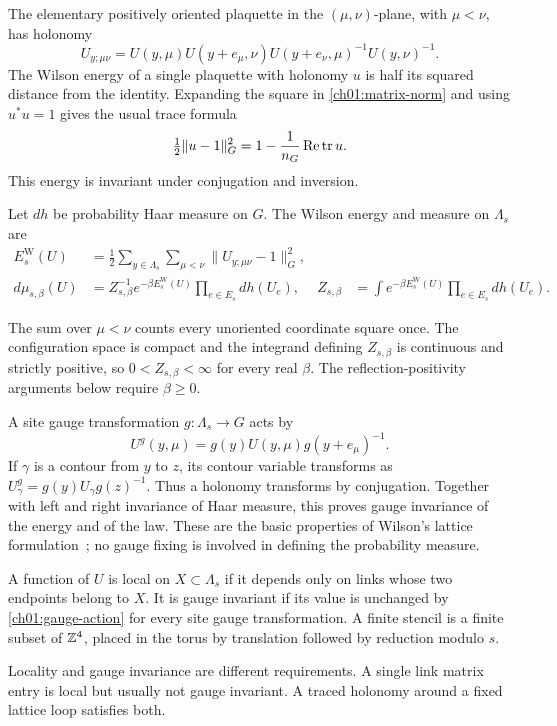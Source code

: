 The elementary positively oriented plaquette in the $(\mu,\nu)$-plane,
with $\mu<\nu$, has holonomy
\begin{equation}
 U_{y;\mu\nu}=U(y,\mu)U(y+e_\mu,\nu)
                 U(y+e_\nu,\mu)^{-1}U(y,\nu)^{-1}.
 \label{ch01:plaquette}
\end{equation}
The Wilson energy of a single plaquette with holonomy $u$ is half its
squared distance from the identity. Expanding the square in
\eqref{ch01:matrix-norm} and using $u^*u=1$ gives the usual trace formula
\[
 \tfrac12\|u-1\|_G^2=1-\frac1{n_G}\operatorname{Re}\operatorname{tr} u .
\]
This energy is invariant under conjugation and inversion.

\begin{definition}
\label{ch01:wilson}
Let $dh$ be probability Haar measure on $G$. The Wilson energy and measure
on $\Lambda_s$ are
\begin{align}
 E_s^{\mathrm W}(U)&=\frac12\sum_{y\in\Lambda_s}\sum_{\mu<\nu}
                                  \|U_{y;\mu\nu}-1\|_G^2,
 \label{ch01:wilson-energy}\\
 d\mu_{s,\beta}(U)&=Z_{s,\beta}^{-1}e^{-\beta E_s^{\mathrm W}(U)}
                     \prod_{e\in E_s}dh(U_e),
 &Z_{s,\beta}&=\int e^{-\beta E_s^{\mathrm W}(U)}\prod_{e\in E_s}dh(U_e).
 \label{ch01:wilson-law}
\end{align}
\end{definition}
The sum over $\mu<\nu$ counts every unoriented coordinate square once.
The configuration space is compact and the integrand defining $Z_{s,\beta}$
is continuous and strictly positive, so $0<Z_{s,\beta}<\infty$ for every
real $\beta$. The reflection-positivity arguments below require
$\beta\ge0$.

A site gauge transformation $g:\Lambda_s\to G$ acts by
\begin{equation}
 U^g(y,\mu)=g(y)U(y,\mu)g(y+e_\mu)^{-1}.
 \label{ch01:gauge-action}
\end{equation}
If $\gamma$ is a contour from $y$ to $z$, its contour variable transforms as
$U_\gamma^g=g(y)U_\gamma g(z)^{-1}$. Thus a holonomy transforms by
conjugation. Together with left and right invariance of Haar measure, this
proves gauge invariance of the energy and of the law. These are the basic
properties of Wilson's lattice formulation~\cite{Wilson1974}; no gauge
fixing is involved in defining the probability measure.

\begin{definition}[Locality]
\label{ch01:locality}
A function of $U$ is local on $X\subset\Lambda_s$ if it depends only on
links whose two endpoints belong to $X$. It is gauge invariant if its value
is unchanged by \eqref{ch01:gauge-action} for every site gauge transformation.
A finite stencil is a finite subset of $\mathbb Z^4$, placed in the torus by
translation followed by reduction modulo $s$.
\end{definition}
Locality and gauge invariance are different requirements. A single link
matrix entry is local but usually not gauge invariant. A traced holonomy
around a fixed lattice loop satisfies both.


